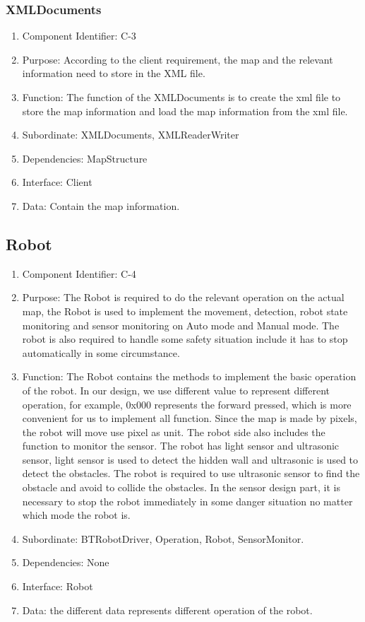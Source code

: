 \documentclass[11pt, a4paper]{report}
\begin{document}
\subsubsection{XMLDocuments}
\begin{enumerate}
\item Component Identifier: C-3
\item Purpose: According to the client requirement, the map and the relevant information need to store in the XML file. 
\item Function: The function of the XMLDocuments is to create the xml file to store the map information and load the map information from the xml file. 
\item Subordinate: XMLDocuments, XMLReaderWriter
\item Dependencies: MapStructure
\item Interface: Client
\item Data: Contain the map information.
\end{enumerate}

\subsection{Robot}
\begin{enumerate}
\item Component Identifier: C-4
\item Purpose: The Robot is required to do the relevant operation on the actual map, the Robot is used to implement the movement, detection, robot state monitoring and sensor monitoring on Auto mode and Manual mode. The robot is also required to handle some safety situation include it has to stop automatically in some circumstance. 
\item Function: The Robot contains the methods to implement the basic operation of the robot. In our design, we use different value to represent different operation, for example, 0x000 represents the forward pressed, which is more convenient for us to implement all function. Since the map is made by pixels, the robot will move use pixel as unit. The robot side also includes the function to monitor the sensor. The robot has light sensor and ultrasonic sensor, light sensor is used to detect the hidden wall and ultrasonic is used to detect the obstacles. The robot is required to use ultrasonic sensor to find the obstacle and avoid to collide the obstacles. In the sensor design part, it is necessary to stop the robot immediately in some danger situation no matter which mode the robot is.      
\item Subordinate: BTRobotDriver, Operation, Robot, SensorMonitor.
\item Dependencies: None
\item Interface: Robot 
\item Data: the different data represents different operation of the robot.  
\end{enumerate}
\end{document}
